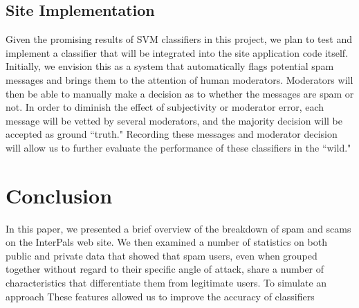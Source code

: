 \documentclass[preprint]{acm_proc_article-sp}
\begin{document}
\subsection{Site Implementation}

Given the promising results of SVM classifiers in this project, we plan to test and implement a classifier that will 
be integrated into the site application code itself. Initially, we envision this as a system that automatically flags 
potential spam messages and brings them to the attention of human moderators. Moderators will then be able to manually 
make a decision as to whether the messages are spam or not. In order to diminish the effect of subjectivity or moderator 
error, each message will be vetted by several moderators, and the majority decision will be accepted as ground ``truth." 
Recording these messages and moderator decision will allow us to further evaluate the performance of these classifiers in 
the ``wild."

\section{Conclusion}

In this paper, we presented a brief overview of the breakdown of spam and scams on the InterPals web site. 
We then examined a number of statistics on both public and private data that showed that spam users, even when 
grouped together without regard to their specific angle of attack, share a number of characteristics that differentiate 
them from legitimate users. To simulate an approach 
These features allowed us to improve the accuracy of classifiers



%




\balancecolumns
\end{document}
